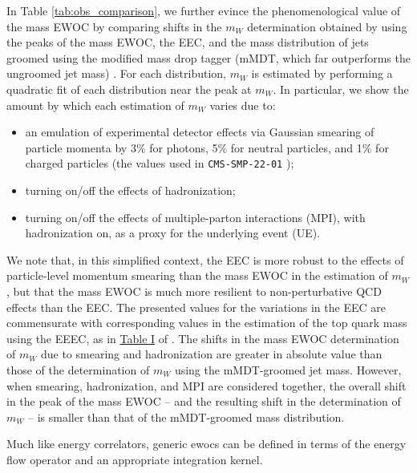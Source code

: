 In Table \ref{tab:obs_comparison}, we further evince the phenomenological value of the mass EWOC by comparing shifts in the \(m_W\) determination obtained by using the peaks of the mass EWOC, the EEC, and the mass distribution of jets groomed using the modified mass drop tagger (mMDT, which far outperforms the ungroomed jet mass) \cite{Dasgupta:2013ihk,Larkoski:2014wba}.
%
For each distribution, \(m_W\) is estimated by performing a quadratic fit of each distribution near the peak at \(m_W\).
%
In particular, we show the amount by which each estimation of \(m_W\) varies due to:
\begin{itemize}
    \item
    an emulation of experimental detector effects via Gaussian smearing of particle momenta by 3\% for photons, 5\% for neutral particles, and 1\% for charged particles (the values used in \texttt{CMS-SMP-22-01} \cite{CMS:2024mlf});

    \item
    turning on/off the effects of hadronization;

    \item
    turning on/off the effects of multiple-parton interactions (MPI), with hadronization on, as a proxy for the underlying event (UE).
\end{itemize}
We note that, in this simplified context, the EEC is more robust to the effects of particle-level momentum smearing than the mass EWOC in the estimation of \(m_W\), but that the mass EWOC is much more resilient to non-perturbative QCD effects than the EEC.
%
The presented values for the variations in the EEC are commensurate with corresponding values in the estimation of the top quark mass using the EEEC, as in \href{https://arxiv.org/pdf/2201.08393\#table.1}{Table I} of .
%
The shifts in the mass EWOC determination of \(m_W\) due to smearing and hadronization are greater in absolute value than those of the determination of \(m_W\) using the mMDT-groomed jet mass.
%
However, when smearing, hadronization, and MPI are considered together, the overall shift in the peak of the mass EWOC -- and the resulting shift in the determination of \(m_W\) -- is smaller than that of the mMDT-groomed mass distribution.


Much like energy correlators, generic \glspl{ewoc} can be defined in terms of the energy flow operator and an appropriate integration kernel.

